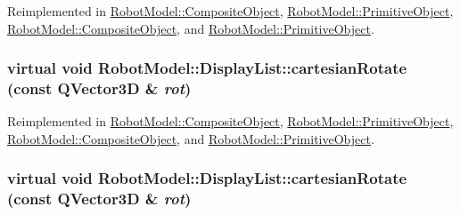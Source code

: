 Reimplemented in \hyperlink{class_robot_model_1_1_composite_object_a357f5ed3f49e0889df511271e468f866}{RobotModel::CompositeObject}, \hyperlink{class_robot_model_1_1_primitive_object_a97b449302680b96410ff7296c794f640}{RobotModel::PrimitiveObject}, \hyperlink{class_robot_model_1_1_composite_object_aa59e7af66ca1a0ced127d8f2b30c7a6d}{RobotModel::CompositeObject}, and \hyperlink{class_robot_model_1_1_primitive_object_ae57db819937782138821a30960a72aa0}{RobotModel::PrimitiveObject}.\hypertarget{class_robot_model_1_1_display_list_a023ba88eaac38b26dc9ea6a358467637}{
\subsubsection[{cartesianRotate}]{\setlength{\rightskip}{0pt plus 5cm}virtual void RobotModel::DisplayList::cartesianRotate (const QVector3D \& {\em rot})}}
\label{class_robot_model_1_1_display_list_a023ba88eaac38b26dc9ea6a358467637}


Reimplemented in \hyperlink{class_robot_model_1_1_composite_object_adadc29cccbba9cb615eaf0ad2fbdd337}{RobotModel::CompositeObject}, \hyperlink{class_robot_model_1_1_primitive_object_a69c30287deb6549fbde68d1ba37424a8}{RobotModel::PrimitiveObject}, \hyperlink{class_robot_model_1_1_composite_object_a7c46e273df7d93cb51b9e16158469509}{RobotModel::CompositeObject}, and \hyperlink{class_robot_model_1_1_primitive_object_aa490f6642a6a02d48cf8ed9cd49a47f7}{RobotModel::PrimitiveObject}.\hypertarget{class_robot_model_1_1_display_list_a023ba88eaac38b26dc9ea6a358467637}{
\subsubsection[{cartesianRotate}]{\setlength{\rightskip}{0pt plus 5cm}virtual void RobotModel::DisplayList::cartesianRotate (const QVector3D \& {\em rot})}}
\label{class_robot_model_1_1_display_list_a023ba88eaac38b26dc9ea6a358467637}



